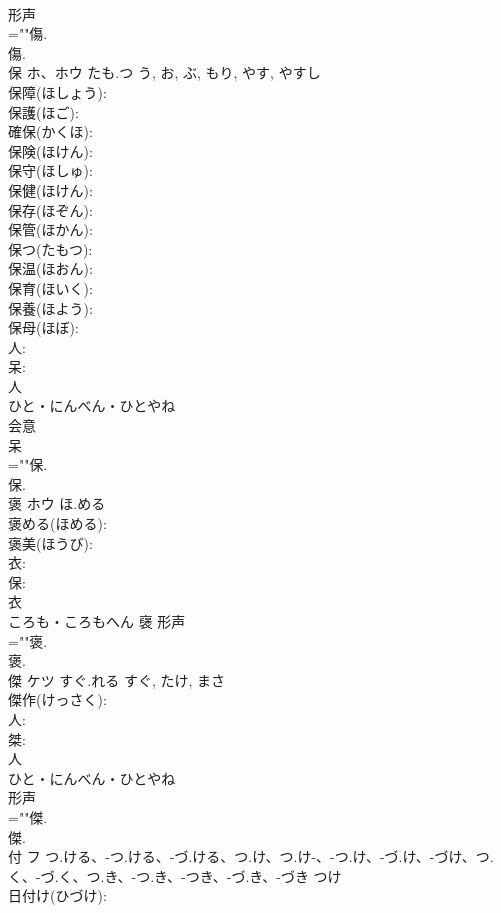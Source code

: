 \documentclass[8pt]{extreport}
\begin{document}
\begin{CJK}{UTF8}{min}
\\	形声 
\\	=""傷.
\\	傷.
\\	保	ホ、ホウ	たも.つ	う, お, ぶ, もり, やす, やすし	
\\	保障(ほしょう): 
\\	保護(ほご): 
\\	確保(かくほ): 
\\	保険(ほけん): 
\\	保守(ほしゅ): 
\\	保健(ほけん): 
\\	保存(ほぞん): 
\\	保管(ほかん): 
\\	保つ(たもつ): 
\\	保温(ほおん): 
\\	保育(ほいく): 
\\	保養(ほよう): 
\\	保母(ほぼ): 
\\	人: 
\\	呆: 
\\	人	
\\	ひと・にんべん・ひとやね	
\\	会意 
\\	呆 
\\	=""保.
\\	保.
\\	褒	ホウ	ほ.める		
\\	褒める(ほめる): 
\\	褒美(ほうび): 
\\	衣: 
\\	保: 
\\	衣	
\\	ころも・ころもへん	襃	形声 
\\	=""褒.
\\	褒.
\\	傑	ケツ	すぐ.れる	すぐ, たけ, まさ	
\\	傑作(けっさく): 
\\	人: 
\\	桀: 
\\	人	
\\	ひと・にんべん・ひとやね	
\\	形声 
\\	=""傑.
\\	傑.
\\	付	フ	つ.ける、-つ.ける、-づ.ける、つ.け、つ.け-、-つ.け、-づ.け、-づけ、つ.く、-づ.く、つ.き、-つ.き、-つき、-づ.き、-づき	つけ	
\\	日付け(ひづけ): 

\end{CJK}
\end{document}
